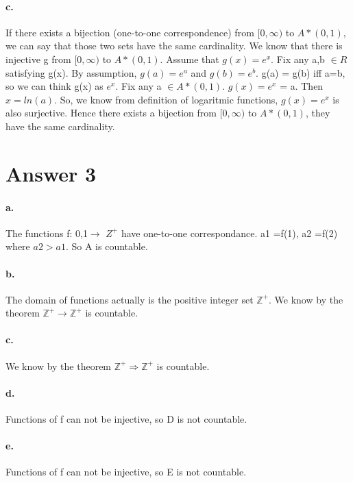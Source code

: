 \documentclass[11pt]{article}
\begin{document}
\paragraph{c.} If there exists a bijection (one-to-one correspondence) from $[0, \infty)$ to $A * (0, 1)$, we can say that those two sets have the same cardinality.
\newline We know that there is injective g from $[0, \infty)$ to $A * (0, 1)$. Assume that $g(x) = e^x$.
\newline Fix any a,b $\in R$ satisfying g(x). By assumption, $g(a) = e^a$ and $g(b) = e^b$.
\newline g(a) = g(b) iff a=b, so we can think g(x) as $e^x$.
\newline Fix any a $\in A * (0, 1)$. $g(x) = e^x$ = a. Then $x =ln(a)$.
\newline So, we know from definition of logaritmic functions, $g(x) = e^x$ is also surjective.
\newline Hence there exists a bijection from $[0, \infty)$ to $A * (0, 1)$, they have the same cardinality.

\section*{Answer 3}
\paragraph{a.} The functions f: {0,1}$ \rightarrow$ $Z^+$ have one-to-one correspondance. a1 =f(1), a2 =f(2)  where $a2>a1$. So A is countable.
\paragraph{b.} The domain of functions actually is the positive integer set $\mathbb{Z}^+$. We know by the theorem $\mathbb{Z}^+\rightarrow\mathbb{Z}^+$ is countable.
\paragraph{c.} We know by the theorem $\mathbb{Z}^+\Rightarrow\mathbb{Z}^+$ is countable.
\paragraph{d.} Functions of f can not be injective, so D is not countable.
\paragraph{e.} Functions of f can not be injective, so E is not countable.
\end{document}
